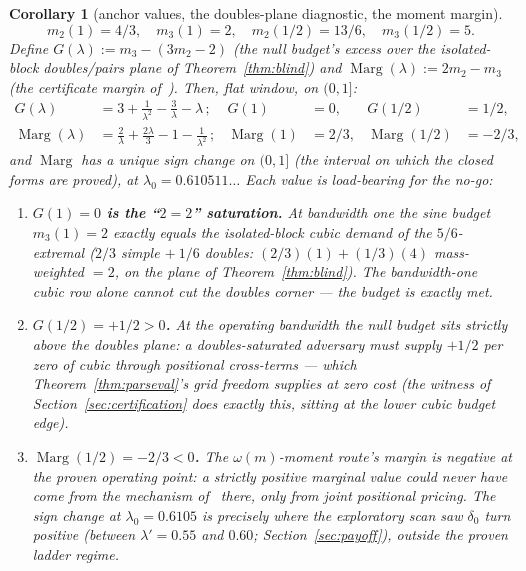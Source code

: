 \documentclass[11pt]{article}
\theoremstyle{plain}
\newtheorem{corollary}[theorem]{Corollary}
\theoremstyle{definition}
\theoremstyle{remark}
\newcommand{\Marg}{\operatorname{Marg}}
\begin{document}
\begin{corollary}[anchor values, the doubles-plane diagnostic, the moment margin]
\label{cor:anchors}
\[
  m_2(1) = 4/3, \quad m_3(1) = 2, \quad m_2(1/2) = 13/6, \quad m_3(1/2) = 5.
\]
Define $G(\lambda) := m_3 - (3 m_2 - 2)$ (the null budget's excess over the
isolated-block doubles/pairs plane of Theorem~\ref{thm:blind}) and
$\Marg(\lambda) := 2 m_2 - m_3$ (the certificate margin
of~\cite[\S7.3]{AF26}). Then, flat window, on $(0, 1]$:
\begin{align*}
  G(\lambda) &= 3 + \frac{1}{\lambda^2} - \frac{3}{\lambda} - \lambda \,;
    & G(1) &= 0, & G(1/2) &= 1/2,\\
  \Marg(\lambda) &= \frac{2}{\lambda} + \frac{2\lambda}{3} - 1
    - \frac{1}{\lambda^2} \,;
    & \Marg(1) &= 2/3, & \Marg(1/2) &= -2/3,
\end{align*}
and $\Marg$ has a unique sign change on $(0, 1]$ (the interval on which the
closed forms are proved), at $\lambda_0 = 0.610511\ldots$ Each value is
load-bearing for the no-go:
\begin{enumerate}
\item \textbf{$G(1) = 0$ is the ``$2 = 2$'' saturation.} At bandwidth one the
  sine budget $m_3(1) = 2$ exactly equals the isolated-block cubic demand of the
  $5/6$-extremal ($2/3$ simple $+\ 1/6$ doubles: $(2/3)(1) + (1/3)(4)$
  mass-weighted $= 2$, on the plane of Theorem~\ref{thm:blind}). The bandwidth-one
  cubic row alone cannot cut the doubles corner --- the budget is exactly met.
\item \textbf{$G(1/2) = +1/2 > 0$.} At the operating bandwidth the null budget
  sits strictly above the doubles plane: a doubles-saturated adversary must
  supply $+1/2$ per zero of cubic through positional cross-terms --- which
  Theorem~\ref{thm:parseval}'s grid freedom supplies at zero cost (the
  witness of Section~\ref{sec:certification} does exactly this, sitting at the
  lower cubic budget edge).
\item \textbf{$\Marg(1/2) = -2/3 < 0$.} The $\omega(m)$-moment route's margin is
  negative at the proven operating point: a strictly positive marginal value
  could never have come from the mechanism of~\cite[\S7.3]{AF26} there, only
  from joint positional pricing. The sign change at $\lambda_0 = 0.6105$ is
  precisely where the exploratory scan saw $\delta_0$ turn positive (between
  $\lambda' = 0.55$ and $0.60$; Section~\ref{sec:payoff}), outside the proven
  ladder regime.
\end{enumerate}
\end{corollary}
\end{document}

